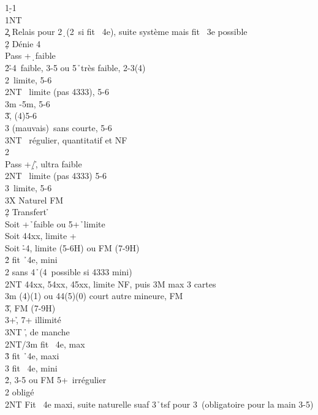 \documentclass[a4paper]{article}
\begin{document}
\begin{bidtable}
1\d-1\h\\
1NT\+\\
2\c \> Relais pour 2\d\ (2\s\ si fit \s\ 4e), suite système mais fit \s\ 3e possible\+\\
2\d \> Dénie 4\s \+\\
Pass +\d\ faible\\
2\h {}\h -4\s\ faible, 3-5 ou 5\h\ très faible, 2-3(4)\\
2\s {}\s\ limite, 5-6\\
2NT \s\ limite (pas 4333), 5-6\\
3m \s -5m, 5-6\\
3\h {}\h , (4)5-6\\
3\s {} (mauvais)\s\ sans courte, 5-6\\
3NT \s\ régulier, quantitatif et NF\-\\
2\s\+\\
Pass +\d /\h , ultra faible\\
2NT \s\ limite (pas 4333) 5-6\\
3\s {}\s\ limite, 5-6\\
3X \> Naturel FM\-\-\\
2\d \> Transfert \h \+\\
Soit +\h\ faible ou 5+\h\ limite\\
Soit \> 44xx, limite +\\
Soit \h -4\s , limite (5-6H) ou FM (7-9H)\\
2\h \> fit \h\ 4e, mini\\
2\s \> sans 4\h\ (4\s\ possible si 4333 mini)\+\\
2NT \> 44xx, 54xx, 45xx, limite NF, puis 3M max 3 cartes\\
3m (4)(1) ou 44(5)(0) court autre mineure, FM\\
3\h {}\h , FM (7-9H)\\
3\s {}+\h , 7+ illimité\\
3NT \h , de manche\-\\
2NT/3m \> fit \s\ 4e, max\\
3\h \> fit \h\ 4e, maxi\\
3\s \> fit \s\ 4e, mini\-\\
2\h {}\s , 3-5 ou FM 5+\s\ irrégulier\+\\
2\s \> obligé\\
2NT \> Fit \s\ 4e maxi, suite naturelle suaf 3\h\ tsf pour 3\s\ (obligatoire pour la main 3-5)\-\\

\end{bidtable}
\end{document}
